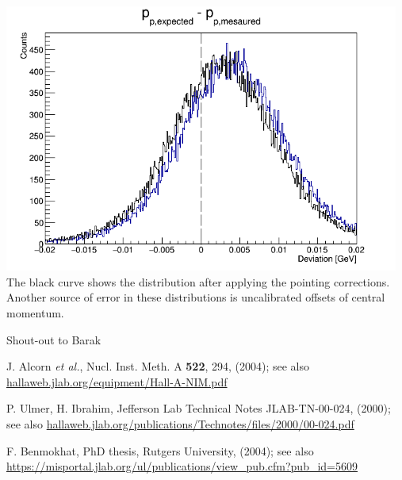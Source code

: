 \documentclass{article}
\begin{document}
\begin{center}
\includegraphics[width=13cm]{../report-H/delPp.png}\\
The black curve shows the distribution after applying the pointing corrections. Another source of error in these distributions is uncalibrated offsets of central momentum.
\end{center}





\clearpage
\begin{thebibliography}{99}

\bibitem{}
Shout-out to Barak

J. Alcorn \textit{et al.}, Nucl. Inst. Meth. A \textbf{522}, 294, (2004); see also \url{hallaweb.jlab.org/equipment/Hall-A-NIM.pdf} 

P. Ulmer, H. Ibrahim, Jefferson Lab Technical Notes JLAB-TN-00-024, (2000); see also \url{hallaweb.jlab.org/publications/Technotes/files/2000/00-024.pdf}

F. Benmokhat, PhD thesis, Rutgers University, (2004); see also \url{https://misportal.jlab.org/ul/publications/view_pub.cfm?pub_id=5609}

\end{thebibliography}


\end{document}
